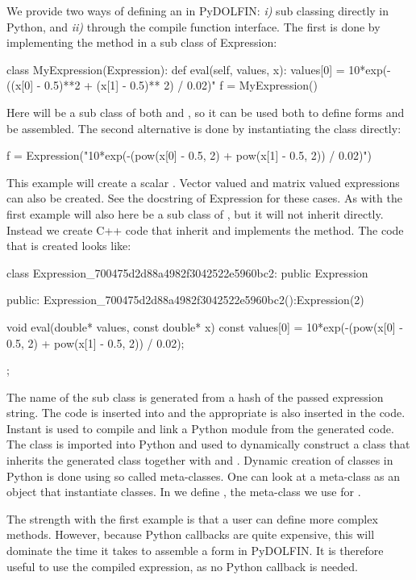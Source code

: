 We provide two ways of defining an  in PyDOLFIN: \textit{i)} sub classing  directly in Python, and \textit{ii)} through the compile function interface. The first is done by implementing the  method in a sub class of Expression:
\begin{python}
class MyExpression(Expression):
    def eval(self, values, x):
        values[0] = 10*exp(-((x[0] - 0.5)**2 + (x[1] - 0.5)** 2) / 0.02)"
f = MyExpression()
\end{python}
Here will  be a sub class of both  and , so it can be used both to define \ufl forms and be assembled. The second alternative is done by instantiating the  class directly:
\begin{c++}
f = Expression("10*exp(-(pow(x[0] - 0.5, 2) + pow(x[1] - 0.5, 2)) / 0.02)")
\end{c++}
This example will create a scalar . Vector valued and matrix valued expressions can also be created. See the docstring of Expression for these cases. As with the first example will  also here be a sub class of , but it will not inherit  directly. Instead we create C++ code that inherit  and implements the  method. The code that is created looks like:
\begin{c++}
class Expression_700475d2d88a4982f3042522e5960bc2: public Expression{
public:
  Expression_700475d2d88a4982f3042522e5960bc2():Expression(2){}

  void eval(double* values, const double* x) const{
    values[0] = 10*exp(-(pow(x[0] - 0.5, 2) + pow(x[1] - 0.5, 2)) / 0.02);
  }
};
\end{c++}
The name of the sub class is generated from a hash of the passed expression string. The code is inserted into  and the appropriate  is also inserted in the code. Instant is used to compile and link a Python module from the generated code. The class is imported into Python and used to dynamically construct a class that inherits the generated class together with  and . Dynamic creation of classes in Python is done using so called meta-classes. One can look at a meta-class as an object that instantiate classes. In  we define , the meta-class we use for .

The strength with the first example is that a user can define more complex  methods. However, because Python callbacks are quite expensive, this will dominate the time it takes to assemble a form in PyDOLFIN. It is therefore useful to use the compiled expression, as no Python callback is needed.


